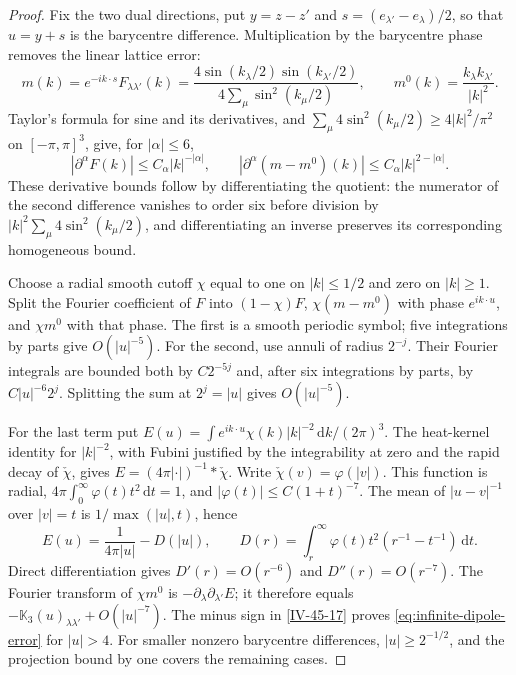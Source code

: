 \documentclass[11pt,letterpaper,reqno]{amsart}
\theoremstyle{definition}
\theoremstyle{remark}
\begin{document}
\begin{proof}
Fix the two dual directions, put $y=z-z'$ and
$s=(e_{\lambda'}-e_\lambda)/2$, so that $u=y+s$ is the
barycentre difference.  Multiplication by the barycentre phase
removes the linear lattice error:
\[
 m(k)=e^{-ik\cdot s}F_{\lambda\lambda'}(k)
       =\frac{4\sin(k_\lambda/2)\sin(k_{\lambda'}/2)}
                    {4\sum_\mu\sin^2(k_\mu/2)},\qquad
 m^0(k)=\frac{k_\lambda k_{\lambda'}}{|k|^2}.
\]
Taylor's formula for sine and its derivatives, and
$\sum_\mu4\sin^2(k_\mu/2)\ge4|k|^2/\pi^2$ on
$[-\pi,\pi]^3$, give, for $|\alpha|\le6$,
\[
 |\partial^\alpha F(k)|\le C_\alpha|k|^{-|\alpha|},\qquad
 |\partial^\alpha(m-m^0)(k)|\le C_\alpha|k|^{2-|\alpha|}.
\]
These derivative bounds follow by differentiating the quotient:
the numerator of the second difference vanishes to order six
before division by $|k|^2\sum_\mu4\sin^2(k_\mu/2)$,
and differentiating an inverse preserves its corresponding
homogeneous bound.

Choose a radial smooth cutoff $\chi$ equal to one on $|k|\le1/2$
and zero on $|k|\ge1$.  Split the Fourier coefficient of $F$
into $(1-\chi)F$, $\chi(m-m^0)$ with phase $e^{ik\cdot u}$,
and $\chi m^0$ with that phase.  The first is a smooth periodic
symbol; five integrations by parts give $O(|u|^{-5})$.
For the second, use annuli of radius $2^{-j}$.  Their Fourier
integrals are bounded both by $C2^{-5j}$ and, after six
integrations by parts, by $C|u|^{-6}2^j$.  Splitting the sum
at $2^j=|u|$ gives $O(|u|^{-5})$.

For the last term put
$E(u)=\int e^{ik\cdot u}\chi(k)|k|^{-2}\,\mathrm{d}k/(2\pi)^3$.
The heat-kernel identity for $|k|^{-2}$, with Fubini justified
by the integrability at zero and the rapid decay of $\check\chi$,
gives $E=(4\pi|\cdot|)^{-1}*\check\chi$.  Write
$\check\chi(v)=\varphi(|v|)$.  This function is radial,
$4\pi\int_0^\infty\varphi(t)t^2\,\mathrm{d}t=1$, and
$|\varphi(t)|\le C(1+t)^{-7}$.  The mean of
$|u-v|^{-1}$ over $|v|=t$ is $1/\max(|u|,t)$, hence
\[
 E(u)=\frac1{4\pi|u|}-D(|u|),\qquad
 D(r)=\int_r^\infty\varphi(t)t^2(r^{-1}-t^{-1})\,\mathrm{d}t.
\]
Direct differentiation gives $D'(r)=O(r^{-6})$ and
$D''(r)=O(r^{-7})$.  The Fourier transform of $\chi m^0$
is $-\partial_\lambda\partial_{\lambda'}E$; it therefore
equals $-\mathbb K_3(u)_{\lambda\lambda'}+O(|u|^{-7})$.
The minus sign in \eqref{IV-45-17} proves
\eqref{eq:infinite-dipole-error} for $|u|>4$.
For smaller nonzero barycentre differences, $|u|\ge2^{-1/2}$,
and the projection bound by one covers the remaining cases.


\end{proof}
\end{document}
